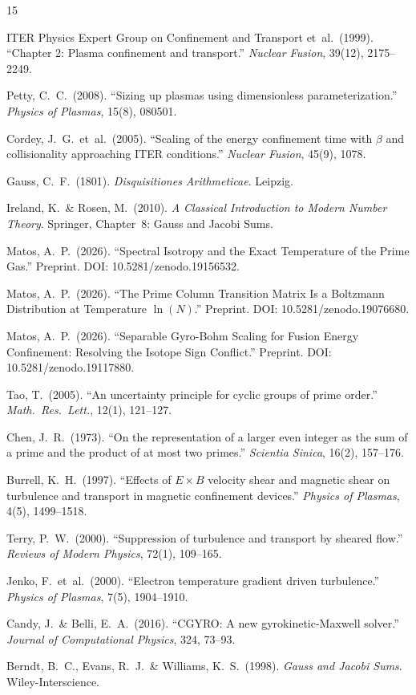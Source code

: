 \documentclass[11pt,letterpaper]{article}
\theoremstyle{definition}
\begin{document}
\begin{thebibliography}{15}

ITER Physics Expert Group on Confinement and Transport et~al.\ (1999).
``Chapter 2: Plasma confinement and transport.''
\textit{Nuclear Fusion}, 39(12), 2175--2249.

Petty, C.~C.\ (2008).
``Sizing up plasmas using dimensionless parameterization.''
\textit{Physics of Plasmas}, 15(8), 080501.

Cordey, J.~G.\ et~al.\ (2005).
``Scaling of the energy confinement time with $\beta$ and collisionality approaching ITER conditions.''
\textit{Nuclear Fusion}, 45(9), 1078.

Gauss, C.~F.\ (1801).
\textit{Disquisitiones Arithmeticae}. Leipzig.

Ireland, K.\ \& Rosen, M.\ (2010).
\textit{A Classical Introduction to Modern Number Theory}. Springer, Chapter~8: Gauss and Jacobi Sums.

Matos, A.~P.\ (2026).
``Spectral Isotropy and the Exact Temperature of the Prime Gas.''
Preprint. DOI: 10.5281/zenodo.19156532.

Matos, A.~P.\ (2026).
``The Prime Column Transition Matrix Is a Boltzmann Distribution at Temperature $\ln(N)$.''
Preprint. DOI: 10.5281/zenodo.19076680.

Matos, A.~P.\ (2026).
``Separable Gyro-Bohm Scaling for Fusion Energy Confinement: Resolving the Isotope Sign Conflict.''
Preprint. DOI: 10.5281/zenodo.19117880.

Tao, T.\ (2005).
``An uncertainty principle for cyclic groups of prime order.''
\textit{Math.\ Res.\ Lett.}, 12(1), 121--127.

Chen, J.~R.\ (1973).
``On the representation of a larger even integer as the sum of a prime and the product of at most two primes.''
\textit{Scientia Sinica}, 16(2), 157--176.

Burrell, K.~H.\ (1997).
``Effects of $E \times B$ velocity shear and magnetic shear on turbulence and transport in magnetic confinement devices.''
\textit{Physics of Plasmas}, 4(5), 1499--1518.

Terry, P.~W.\ (2000).
``Suppression of turbulence and transport by sheared flow.''
\textit{Reviews of Modern Physics}, 72(1), 109--165.

Jenko, F.\ et~al.\ (2000).
``Electron temperature gradient driven turbulence.''
\textit{Physics of Plasmas}, 7(5), 1904--1910.

Candy, J.\ \& Belli, E.~A.\ (2016).
``CGYRO: A new gyrokinetic-Maxwell solver.''
\textit{Journal of Computational Physics}, 324, 73--93.

Berndt, B.~C., Evans, R.~J.\ \& Williams, K.~S.\ (1998).
\textit{Gauss and Jacobi Sums}. Wiley-Interscience.

\end{thebibliography}
\end{document}
